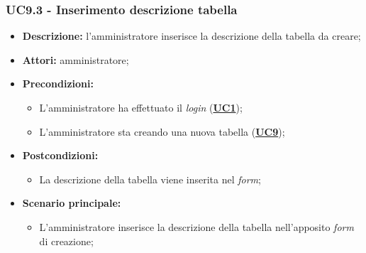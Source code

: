 \subsubsection{UC9.3 - Inserimento descrizione tabella}
\label{sec:UC9.3}
\begin{itemize}
	\item \textbf{Descrizione:} l’amministratore inserisce la descrizione della tabella da creare;
	\item \textbf{Attori:} amministratore;
	\item \textbf{Precondizioni:} 
	\begin{itemize}
		\item L’amministratore ha effettuato il \textit{login} (\hyperref[sec:UC1]{\textbf{UC1}});
		\item L’amministratore sta creando una nuova tabella (\hyperref[sec:UC9]{\textbf{UC9}});
	\end{itemize}
	\item \textbf{Postcondizioni:} 
	\begin{itemize}
		\item La descrizione della tabella viene inserita nel \textit{form};
	\end{itemize}
	\item \textbf{Scenario principale:} 
	\begin{itemize}
		\item L’amministratore inserisce la descrizione della tabella nell'apposito \textit{form} di creazione;
	\end{itemize}
\end{itemize}

